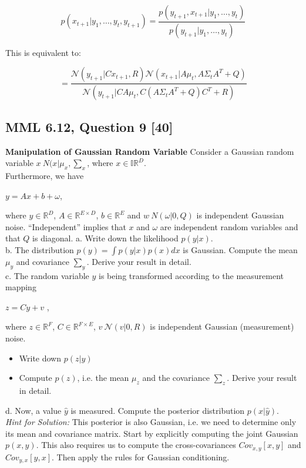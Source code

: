 \documentclass[12pt]{article}
\begin{document}
\[
p(x_{t+1} | y_1, \ldots, y_t, y_{t+1}) = \frac{p(y_{t+1}, x_{t+1} | y_1, \ldots, y_t)}{p(y_{t+1} | y_1, \ldots, y_t)}
\]

This is equivalent to:

\[
= \frac{\mathcal{N}(y_{t+1} | C x_{t+1}, R) \mathcal{N}(x_{t+1} | A \mu_t, A \Sigma_t A^T + Q)}{\mathcal{N}(y_{t+1} | C A \mu_t, C (A \Sigma_t A^T + Q) C^T + R)}
\]

\subsection*{MML 6.12, Question 9 [40]}
\textbf{Manipulation of Gaussian Random Variable}
Consider a Gaussian random variable \( x~N(x| \mu_x, \sum_x \), where \( x \in \mathbb{IR}^D\).\\
Furthermore, we have
\begin{center}
    \( y = Ax+ b + \omega \),
\end{center}
where \( y \in \mathbb{R}^D\), \( A \in \mathbb{R}^{E \times D}\), \( b \in \mathbb{R}^E\) and \( w ~ N( \omega | 0,Q) \) is independent Gaussian noise. ``Independent'' implies that $x$ and \( \omega \) are independent random variables and that $Q$ is diagonal.
a. Write down the likelihood \( p(y |x ) \).\\
b. The distribution  \( p(y) = \int p(y | x)p(x)dx \) is Gaussian. Compute the mean \( \mu_y \) and covariance \( \sum_y \). Derive your result in detail.\\
c. The random variable \( y \) is being transformed according to the measurement mapping
\begin{center}
    \( z = Cy +v \) ,
\end{center}
where \( z \in \mathbb{R}^F\), \( C \in \mathbb{R}^{F \times E}\), \( v~\mathcal{N}(v|0,R) \) is independent Gaussian (measurement) noise.\\
\begin{itemize}
\item{Write down \( p(z |y) \)}
\item{Compute \( p(z) \), i.e. the mean \( \mu_z \) and the covariance \( \sum_z \). Derive your result in detail.}
\end{itemize}
d. Now, a value \( \hat y \) is measured. Compute the posterior distribution \( p(x|\hat y) \).\\
\textit{Hint for Solution:} This posterior is also Gaussian, i.e. we need to determine only its mean and covariance matrix. Start by explicitly computing the joint  Gaussian  \( p(x,y) \). This also requires us to compute the cross-covariances \( Cov_{x,y}[x,y] \) and \( Cov_{y,x}[y,x] \). Then apply the rules for Gaussian conditioning.
\end{document}
